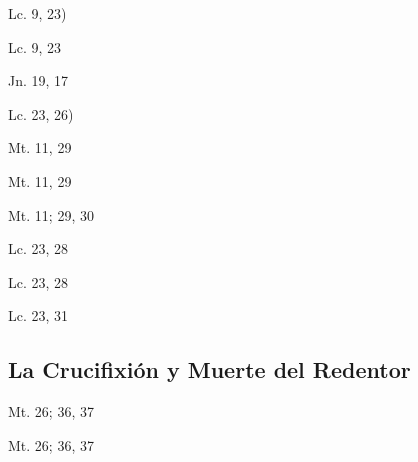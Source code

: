\documentclass[a4paper,11pt,sans]{article}
\begin{document}
      \begin{center}
        Lc. 9, 23)
      \end{center}

      \begin{center}
        Lc. 9, 23
      \end{center}

      \begin{center}
        Jn. 19, 17
      \end{center}

      \begin{center}
        Lc. 23, 26)
      \end{center}

      \begin{center}
        Mt. 11, 29  
      \end{center}

      \begin{center}
        Mt. 11, 29
      \end{center}

      \begin{center}
        Mt. 11; 29, 30
      \end{center}

      \begin{center}
        Lc. 23, 28
      \end{center}

      \begin{center}
        Lc. 23, 28
      \end{center}

      \begin{center}
        Lc. 23, 31
      \end{center}

    \subsection*{\hfil La Crucifixión y Muerte del Redentor \hfil}
      
      \begin{center}
        Mt. 26; 36, 37     
      \end{center}

      \begin{center}
        Mt. 26; 36, 37     
      \end{center}
\end{document}
